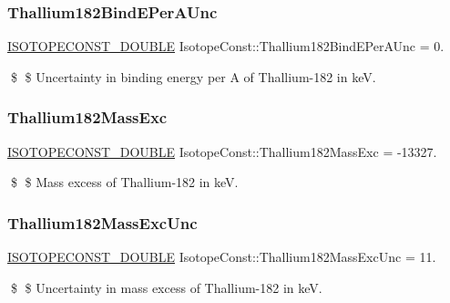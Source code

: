 \subsubsection{\texorpdfstring{Thallium182\+Bind\+E\+Per\+A\+Unc}{Thallium182BindEPerAUnc}}
{\footnotesize\ttfamily \mbox{\hyperlink{group___isotope_const-_macros_ga8f45a7272ce02c0b4c65c44636ed719a}{I\+S\+O\+T\+O\+P\+E\+C\+O\+N\+S\+T\+\_\+\+D\+O\+U\+B\+LE}} Isotope\+Const\+::\+Thallium182\+Bind\+E\+Per\+A\+Unc = 0.}

\$ \$ Uncertainty in binding energy per A of Thallium-\/182 in keV. \mbox{\label{group___isotope_const-_thallium-_tl182_ga56c5247e4fe373e9bf8adfa1d1c35a10}} 
\subsubsection{\texorpdfstring{Thallium182\+Mass\+Exc}{Thallium182MassExc}}
{\footnotesize\ttfamily \mbox{\hyperlink{group___isotope_const-_macros_ga8f45a7272ce02c0b4c65c44636ed719a}{I\+S\+O\+T\+O\+P\+E\+C\+O\+N\+S\+T\+\_\+\+D\+O\+U\+B\+LE}} Isotope\+Const\+::\+Thallium182\+Mass\+Exc = -\/13327.}

\$ \$ Mass excess of Thallium-\/182 in keV. \mbox{\label{group___isotope_const-_thallium-_tl182_gaaa3aa545dceb7bfced59da99093c49c8}} 
\subsubsection{\texorpdfstring{Thallium182\+Mass\+Exc\+Unc}{Thallium182MassExcUnc}}
{\footnotesize\ttfamily \mbox{\hyperlink{group___isotope_const-_macros_ga8f45a7272ce02c0b4c65c44636ed719a}{I\+S\+O\+T\+O\+P\+E\+C\+O\+N\+S\+T\+\_\+\+D\+O\+U\+B\+LE}} Isotope\+Const\+::\+Thallium182\+Mass\+Exc\+Unc = 11.}

\$ \$ Uncertainty in mass excess of Thallium-\/182 in keV. \mbox{\label{group___isotope_const-_thallium-_tl182_gaa7ee87e473ad3431f2871dd041bfe679}} 
